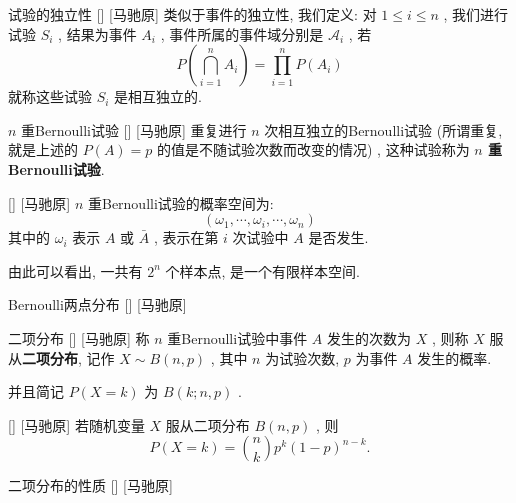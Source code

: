 \documentclass[UTF8]{ctexart}
\begin{document}
        \begin{dfn}
            []
            {试验的独立性}
            []
            [马驰原]
            类似于事件的独立性, 我们定义: 对 \(1\leq i\leq n\) , 我们进行试验 \(S_i\) , 结果为事件 \(A_i\) , 事件所属的事件域分别是 \(\mathcal{A}_i\) , 若\[P\left(\bigcap^{n}_{i=1} A_i\right) =\prod_{i=1}^{n}P(A_i)\]
            就称这些试验 \(S_i\) 是相互独立的. 
        \end{dfn}

        \begin{dfn}
            []
            { \(n\) 重Bernoulli试验}
            []
            [马驰原]
            重复进行 \(n\) 次相互独立的Bernoulli试验 (所谓重复, 就是上述的 \(P(A)=p\) 的值是不随试验次数而改变的情况) , 这种试验称为\textbf{ \(n\) 重Bernoulli试验}. 
        \end{dfn}

        \begin{ppt}
            []
            {}
            []
            [马驰原]
             \(n\) 重Bernoulli试验的概率空间为: \[(\omega_1,\cdots,\omega_i,\cdots,\omega_n)\]其中的 \(\omega_i\) 表示 \(A\) 或 \(\bar{A}\) , 表示在第 \(i\) 次试验中 \(A\) 是否发生. 

            由此可以看出, 一共有 \(2^n\) 个样本点, 是一个有限样本空间. 
        \end{ppt}

        \begin{dfn}
            []
            {Bernoulli两点分布}
            []
            [马驰原]
        \end{dfn}

        \begin{dfn}
            []
            {二项分布}
            []
            [马驰原]
            称 \(n\) 重Bernoulli试验中事件 \(A\) 发生的次数为 \(X\) , 则称 \(X\) 服从\textbf{二项分布}, 记作 \(X\sim B(n,p)\) , 其中 \(n\) 为试验次数,  \(p\) 为事件 \(A\) 发生的概率. 

            并且简记 \(P(X=k)\) 为 \(B(k;n,p)\) .
        \end{dfn}

        \begin{thm}
            []
            {}
            []
            [马驰原]
            若随机变量 \(X\) 服从二项分布 \(B(n,p)\) , 则\[P(X=k)=\binom{n}{k}p^k(1-p)^{n-k}.\]
        \end{thm}

        \begin{ppt}
            []
            {二项分布的性质}
            []
            [马驰原]
        \end{ppt}
\end{document}
